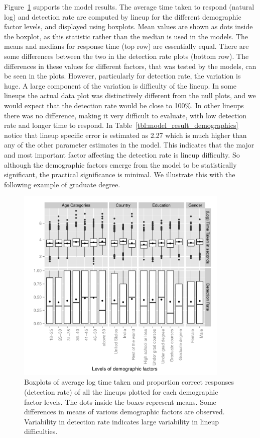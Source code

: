 \documentclass[10pt]{article}\usepackage[]{graphicx}\usepackage[]{xcolor}
\begin{document}
Figure~\ref{fig:demographic_effect} supports the model results. The average time taken to respond (natural log) and detection rate are computed by lineup for the different demographic factor levels, and displayed using boxplots. Mean values are shown as dots inside the boxplot, as this statistic rather than the median is used in the models. The means and medians for response time (top row) are essentially equal. There are some differences between the two in the detection rate plots (bottom row). The differences in these values for different factors, that was tested by the models, can be seen in the plots. However, particularly for detection rate, the variation is huge. A large component of the variation is difficulty of the lineup. In some lineups the actual data plot was distinctively different from the null plots, and we would expect that the detection rate would be close to 100\%. In other lineups there was no difference, making it very difficult to evaluate, with low detection rate and longer time to respond. In Table~\ref{tbl:model_result_demographics} notice that lineup specific error is estimated as 2.27 which is much higher than any of the other parameter estimates in the model. This indicates that the major and most important factor affecting the detection rate is  lineup difficulty.  So although the demographic factors emerge from the model to be statistically significant, the practical significance is minimal. We illustrate this with the following example of graduate degree.



\begin{figure}[htbp] 
   \centering
   \includegraphics[width=4in]{demographic_effect.pdf} 
   \caption{Boxplots of average log time taken and proportion correct responses (detection rate) of all the lineups plotted for each demographic factor levels. The dots inside the boxes represent means. Some differences in means of various demographic factors are observed. Variability in detection rate indicates large variability in lineup difficulties. }
   \label{fig:demographic_effect}
\end{figure}
\end{document}
